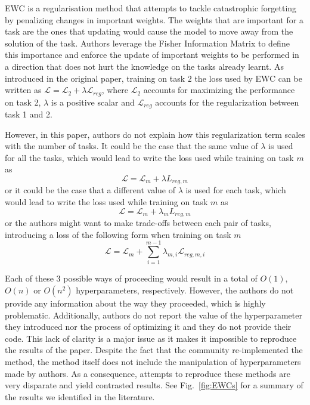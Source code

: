 \documentclass[11pt]{article}
\begin{document}
\vspace{2mm}
\noindent
EWC is a regularisation method that attempts to tackle catastrophic forgetting by penalizing changes in important weights. The weights that are important for a task are the ones that updating would cause the model to move away from the solution of the task. Authors leverage the Fisher Information Matrix to define this importance and enforce the update of important weights to be performed in a direction that does not hurt the knowledge on the tasks already learnt. As introduced in the original paper, training on task $2$ the loss used by EWC can be written as $\mathcal{L} = \mathcal{L}_{2} + \lambda\mathcal{L}_{reg}$, where $\mathcal{L}_{2}$ accounts for maximizing the performance on task 2, $\lambda$ is a positive scalar and $\mathcal{L}_{reg}$ accounts for the regularization between task 1 and 2.

\vspace{2mm}
\noindent
However, in this paper, authors do not explain how this regularization term scales with the number of tasks. It could be the case that the same value of $\lambda$ is used for all the tasks, which would lead to write the loss used while training on task $m$ as 
\begin{equation}
    \mathcal{L} = \mathcal{L}_{m} + \lambda{L}_{reg,m}
\end{equation}
or it could be the case that a different value of $\lambda$ is used for each task, which would lead to write the loss used while training on task $m$ as
\begin{equation}
    \mathcal{L} = \mathcal{L}_{m} + \lambda_{m}{L}_{reg,m}
\end{equation}
or the authors might want to make trade-offs between each pair of tasks, introducing a loss of the following form when training on task $m$
\begin{equation}
    \mathcal{L} = \mathcal{L}_{m} + \sum_{i=1}^{m-1}\lambda_{m,i}\mathcal{L}_{reg,m,i}
\end{equation}

\vspace{2mm}
\noindent
Each of these $3$ possible ways of proceeding would result in a total of $O(1)$, $O(n)$ or $O(n^2)$ hyperparameters, respectively. However, the authors do not provide any information about the way they proceeded, which is highly problematic. Additionally, authors do not report the value of the hyperparameter they introduced nor the process of optimizing it and they do not provide their code. This lack of clarity is a major issue as it makes it impossible to reproduce the results of the paper. Despite the fact that the community re-implemented the method, the method itself does not include the manipulation of hyperparameters made by authors. As a consequence, attempts to reproduce these methods are very disparate and yield contrasted results. See Fig.~\ref{fig:EWCs} for a summary of the results we identified in the literature.
\end{document}
